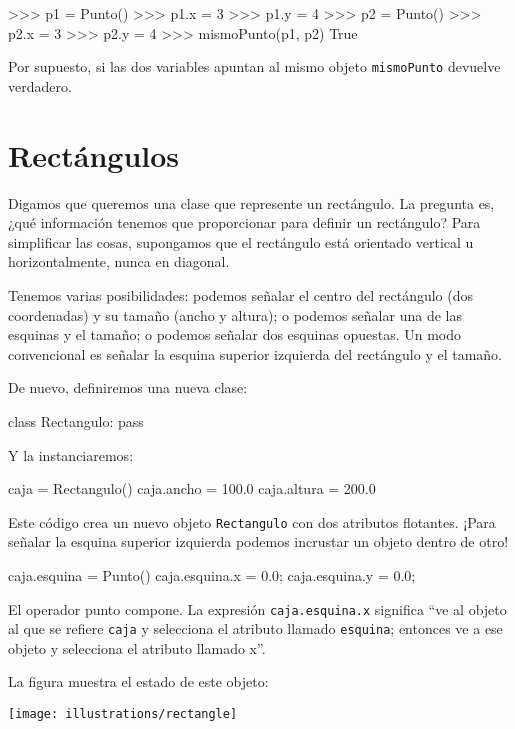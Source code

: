 \begin{pyconcode}
>>> p1 = Punto()
>>> p1.x = 3
>>> p1.y = 4
>>> p2 = Punto()
>>> p2.x = 3
>>> p2.y = 4
>>> mismoPunto(p1, p2)
True
\end{pyconcode}
 Por supuesto, si las dos variables apuntan al mismo objeto \texttt{mismoPunto}
devuelve verdadero.

\section{Rectángulos}

\label{embedded} 

Digamos que queremos una clase que represente un rectángulo. La pregunta
es, ¿qué información tenemos que proporcionar para definir un rectángulo?
Para simplificar las cosas, supongamos que el rectángulo está orientado
vertical u horizontalmente, nunca en diagonal.

Tenemos varias posibilidades: podemos señalar el centro del rectángulo
(dos coordenadas) y su tamaño (ancho y altura); o podemos señalar
una de las esquinas y el tamaño; o podemos señalar dos esquinas opuestas.
Un modo convencional es señalar la esquina superior izquierda del
rectángulo y el tamaño.

De nuevo, definiremos una nueva clase:
\begin{pythoncode}
class Rectangulo:	
  pass
\end{pythoncode}

Y la instanciaremos:
\begin{pythoncode}
caja = Rectangulo()
caja.ancho = 100.0
caja.altura = 200.0
\end{pythoncode}

Este código crea un nuevo objeto \texttt{Rectangulo} con dos atributos
flotantes. ¡Para señalar la esquina superior izquierda podemos incrustar
un objeto dentro de otro!
\begin{pythoncode}
caja.esquina = Punto()
caja.esquina.x = 0.0;
caja.esquina.y = 0.0;
\end{pythoncode}

El operador punto compone. La expresión \texttt{caja.esquina.x} significa
``ve al objeto al que se refiere \texttt{caja} y selecciona el atributo
llamado \texttt{esquina}; entonces ve a ese objeto y selecciona el
atributo llamado x''.

La figura muestra el estado de este objeto:

\beforefig \centerline{\texttt{[image: illustrations/rectangle]}}
\afterfig

